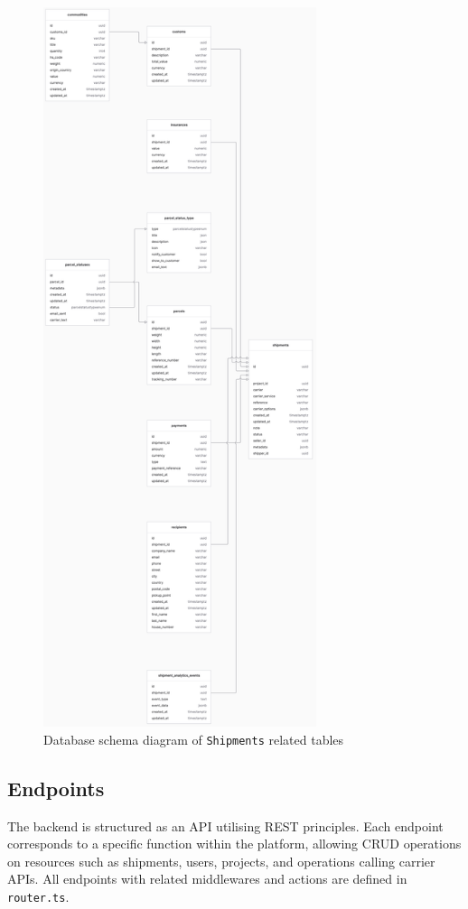 \begin{figure}[H]\centering
\includegraphics[width=80mm]{img/docs/fig_db_schema_shipments.png}
\caption{Database schema diagram of \texttt{Shipments} related tables}
\label{imgdocs:db-schema-shipments}
\end{figure}
\subsection{Endpoints}
The backend is structured as an API utilising REST principles.
Each endpoint corresponds to a specific function within the platform, allowing \ac{CRUD} operations on resources such as shipments, users, projects, and operations calling carrier APIs. 
All endpoints with related middlewares and actions are defined in \texttt{router.ts}.

